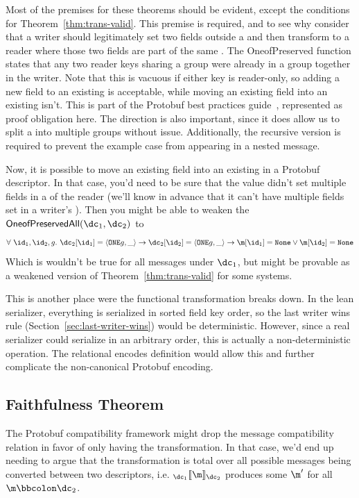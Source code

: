 Most of the premises for these theorems should be evident, except the
\Oneof{} conditions for Theorem~\ref{thm:trans-valid}. This premise is
required, and to see why consider that a writer should legitimately set two
fields outside a \Oneof{} and then transform to a reader where those two
fields are part of the same \Oneof. The OneofPreserved function states
that any two reader keys sharing a \Oneof{} group were already in a group
together in the writer. Note that this is vacuous if either key is reader-only,
so adding a new field to an existing \Oneof{} is acceptable, while moving
an existing field into an existing \Oneof{} isn't. This is part of the
Protobuf best practices guide~\cite{LanguageGuideProto}, represented as proof
obligation here. The direction is also important, since it does allow us to
split a \Oneof{} into multiple \Oneof{} groups without
issue. Additionally, the recursive version is required to prevent the example
case from appearing in a nested message.

Now, it is possible to move an existing field into an existing \Oneof{} in
a Protobuf descriptor. In that case, you'd need to be sure that the value didn't
set multiple fields in a \Oneof{} of the reader (we'll know in advance
that it can't have multiple fields set in a writer's \Oneof). Then you
might be able to weaken the $\oneofpresall(\dc_1, \dc_2)$ to
\[ \forall\ \id_1, \id_2, g.\ \dc_2[\id_1] = \field{\oneof{g}}{\_} \rightarrow \dc_2[\id_2] = \field{\oneof{g}}{\_} \to
  \m[\id_1] = \none \vee \m[\id_2] = \none \]
Which is wouldn't be true for all messages under $\dc_1$, but might be provable
as a weakened version of Theorem~\ref{thm:trans-valid} for some systems.

{\color{red} This is another place were the functional transformation breaks
  down. In the lean serializer, everything is serialized in sorted field key
  order, so the last writer wins rule (Section~\ref{sec:last-writer-wins}) would
  be deterministic. However, since a real serializer could serialize in an
  arbitrary order, this is actually a non-deterministic operation. The
  relational encodes definition would allow this and further complicate the
  non-canonical Protobuf encoding.}

\subsection{Faithfulness Theorem}

The Protobuf compatibility framework might drop the message compatibility
relation in favor of only having the transformation. In that case, we'd end up
needing to argue that the transformation is total over all possible messages
being converted between two descriptors, i.e. $\coercion{\dc_1}{\m}{\dc_2}$ produces
some $\m'$ for all $\validv{\m}{\dc_2}$.

